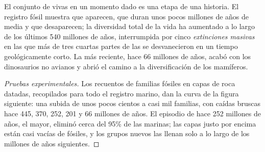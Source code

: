 \begin{proposition}\label{prop:g10:biodiversity-scales:changes}
El conjunto de  vivas en un momento dado es una etapa de una
historia. El registro fósil muestra  que aparecen, que duran
unos pocos millones de años de media y que desaparecen; la diversidad
total de la vida ha aumentado a lo largo de los últimos 540 millones de
años, interrumpida por cinco \emph{extinciones masivas}
en las que más de tres cuartas partes de las  se desvanecieron
en un tiempo geológicamente corto. La más reciente, hace 66 millones de
años, acabó con los dinosaurios no avianos y abrió el camino a la
diversificación de los mamíferos.
\end{proposition}
\begin{proof}[Pruebas experimentales]
Los recuentos de familias fósiles en capas de roca datadas, recopilados
para todo el registro marino, dan la curva de la figura siguiente: una
subida de unos pocos cientos a casi mil familias, con caídas bruscas
hace 445, 370, 252, 201 y 66 millones de años. El episodio de hace 252
millones de años, el mayor, eliminó cerca del 95\% de las 
marinas; las capas justo por encima están casi vacías de fósiles, y los
grupos nuevos las llenan solo a lo largo de los millones de años
siguientes.
\end{proof}

